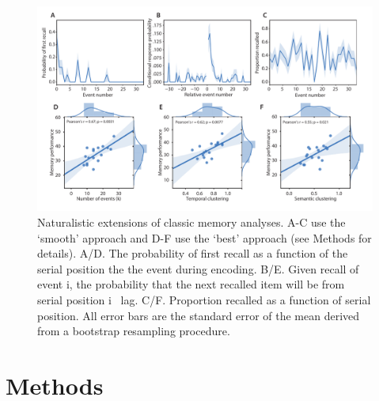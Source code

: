 \documentclass[a4paper,man,natbib,floatsintext]{apa6}
\newcommand{\rpm}{\raisebox{.2ex}{$\scriptstyle\pm$}}
\begin{document}
\begin{figure}[t!]
\centering
\includegraphics[width=1\textwidth]{figs/4_behav_eventseg.pdf}
\caption{\label{fig:behav}Naturalistic extensions of classic memory analyses. A-C use the `smooth' approach and D-F use the `best' approach (see Methods for details). A/D. The probability of first recall as a function of the serial position the the event during encoding. B/E. Given recall of event i, the probability that the next recalled item will be from serial position i \rpm~lag. C/F. Proportion recalled as a function of serial position. All error bars are the standard error of the mean derived from a bootstrap resampling procedure.
}
\end{figure}

\section{Methods}
\label{sec:methods}
\end{document}
